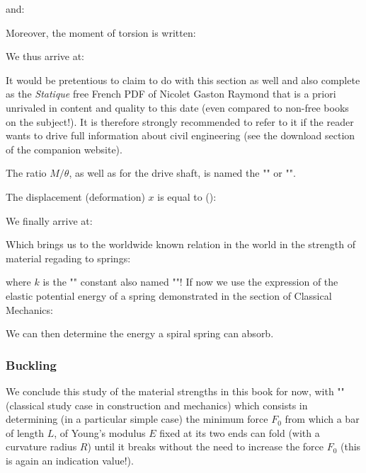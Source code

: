 	and:
	
	Moreover, the moment of torsion is written:
	
	We thus arrive at:
	
	\begin{tcolorbox}[title=Remark,colframe=black,arc=10pt]
	It would be pretentious to claim to do with this section as well and also complete as the \textit{Statique} free French PDF of Nicolet Gaston Raymond that is a priori unrivaled in content and quality to this date (even compared to non-free books on the subject!). It is therefore strongly recommended to refer to it if the reader wants to drive full information about civil engineering (see the download section of the companion website).
	\end{tcolorbox}
	The ratio $M/\theta$, as well as for the drive shaft, is named the "" or  "".

	The displacement (deformation) $x$ is equal to ():
	
	We finally arrive at:
	
	Which brings us to the worldwide known relation in the world in the strength of material regading to springs:
	
	where $k$ is the "" constant also named ""! If now we use the expression of the elastic potential energy of a spring demonstrated in the section of Classical Mechanics:
	
	We can then determine the energy a spiral spring can absorb.
	
	\subsubsection{Buckling}
	We conclude this study of the material strengths in this book for now, with "" (classical study case in construction and mechanics) which consists in determining (in a particular simple case) the minimum force $F_0$ from which a bar of length $L$, of Young's modulus $E$ fixed at its two ends can fold (with a curvature radius $R$) until it breaks without the need to increase the force $F_0$ (this is again an indication value!).

